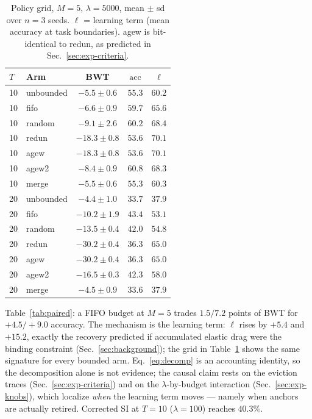 \documentclass[review,12pt,number]{elsarticle}
\newcommand{\acc}{\mathrm{acc}}
\begin{document}
\begin{table}[t]
\centering\small
\caption{Policy grid, $M{=}5$, $\lambda{=}5000$, mean $\pm$ sd over
$n{=}3$ seeds. $\ell$ = learning term (mean accuracy at task
boundaries). agew is bit-identical to redun, as predicted in
Sec.~\ref{sec:exp-criteria}.}
\label{tab:grid}
\begin{tabular}{llccc}
\toprule
$T$ & Arm & BWT & $\acc$ & $\ell$ \\
\midrule
10 & unbounded & $-5.5\pm0.6$   & $55.3$ & $60.2$ \\
10 & fifo      & $-6.6\pm0.9$   & $59.7$ & $65.6$ \\
10 & random    & $-9.1\pm2.6$   & $60.2$ & $68.4$ \\
10 & redun     & $-18.3\pm0.8$  & $53.6$ & $70.1$ \\
10 & agew      & $-18.3\pm0.8$  & $53.6$ & $70.1$ \\
10 & agew2     & $-8.4\pm0.9$   & $60.8$ & $68.3$ \\
10 & merge     & $-5.5\pm0.6$   & $55.3$ & $60.3$ \\
\midrule
20 & unbounded & $-4.4\pm1.0$   & $33.7$ & $37.9$ \\
20 & fifo      & $-10.2\pm1.9$  & $43.4$ & $53.1$ \\
20 & random    & $-13.5\pm0.4$  & $42.0$ & $54.8$ \\
20 & redun     & $-30.2\pm0.4$  & $36.3$ & $65.0$ \\
20 & agew      & $-30.2\pm0.4$  & $36.3$ & $65.0$ \\
20 & agew2     & $-16.5\pm0.3$  & $42.3$ & $58.0$ \\
20 & merge     & $-4.5\pm0.9$   & $33.6$ & $37.9$ \\
\bottomrule
\end{tabular}
\end{table}

Table~\ref{tab:paired}: a FIFO budget at $M{=}5$ trades $1.5/7.2$ points
of BWT for $+4.5/+9.0$ accuracy. The mechanism is the learning term:
$\ell$ rises by $+5.4$ and $+15.2$, exactly the recovery predicted if
accumulated elastic drag were the binding constraint
(Sec.~\ref{sec:background}); the grid in Table~\ref{tab:grid} shows the
same signature for every bounded arm.
Eq.~\ref{eq:decomp} is an accounting identity, so the decomposition
alone is not evidence; the causal claim rests on the eviction traces
(Sec.~\ref{sec:exp-criteria}) and on the $\lambda$-by-budget
interaction (Sec.~\ref{sec:exp-knobs}), which localize \emph{when}
the learning term moves --- namely when anchors are actually retired.
Corrected SI at $T{=}10$ ($\lambda{=}100$) reaches $40.3\%$.
\end{document}
